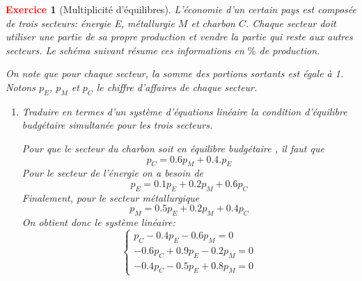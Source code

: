 \documentclass[11pt]{article}
\theoremstyle{mythmstyle}
\newtheorem{exo}{\textcolor{red}{\textbf{Exercice}}}
\begin{document}
\begin{exo}[Multiplicité d'équilibres]
L'économie d'un certain pays est composée de trois secteurs: énergie E, métallurgie $M$ et charbon $C$.  Chaque secteur doit utiliser une partie de sa propre production et vendre la partie qui reste aux autres secteurs.
Le schéma suivant résume ces informations en $\%$ de production.


\begin{figure}[H]
\centering
{}
\end{figure}


On note que pour chaque secteur, la somme des portions sortants est égale à 1. Notons $p_E$, $p_M$ et $p_C$ le chiffre d'affaires de chaque secteur.
 
 
 \begin{enumerate}
 \item Traduire en termes d'un système d'équations linéaire la condition d'équilibre budgétaire simultanée pour les trois secteurs.
 \begin{solution}
 Pour que le secteur du charbon soit en équilibre budgétaire , il faut que 
 $$p_C= 0.6 p_M+ 0.4.p_E$$
 Pour le secteur de l'énergie on a besoin de 
 $$
 p_E=0.1p_E+ 0.2p_M+ 0.6p_C
 $$
 Finalement, pour le secteur métallurgique
 $$
 p_M=0.5p_E+ 0.2p_M+ 0.4p_C
 $$
 On obtient donc le système linéaire:
 $$
 \begin{cases}
  p_C- 0.4p_E - 0.6p_M=0\\
- 0.6p_C +0.9p_E- 0.2p_M =0\\
-0.4p_C - 0.5p_E+0.8p_M =0
 \end{cases}
 $$


\end{solution}
\end{enumerate}
\end{exo}
\end{document}
